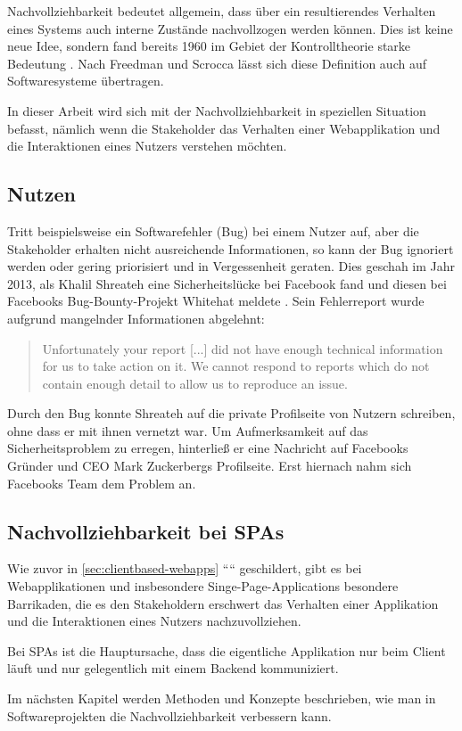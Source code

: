 Nachvollziehbarkeit bedeutet allgemein, dass über ein resultierendes Verhalten eines Systems auch interne Zustände nachvollzogen werden können. Dies ist keine neue Idee, sondern fand bereits 1960 im Gebiet der Kontrolltheorie starke Bedeutung \cite{OnTheGeneralTheoryOfControlSystems}. Nach Freedman \cite{TestabilityOfSoftwareComponents} und Scrocca \etal \cite{EnablingEventDrivenObservability} lässt sich diese Definition auch auf Softwaresysteme übertragen.
	
In dieser Arbeit wird sich mit der Nachvollziehbarkeit in speziellen Situation befasst, nämlich wenn die Stakeholder das Verhalten einer Webapplikation und die Interaktionen eines Nutzers verstehen möchten.%
	
\subsection{Nutzen}
	
Tritt beispielsweise ein Softwarefehler (Bug) bei einem Nutzer auf, aber die Stakeholder erhalten nicht ausreichende Informationen, so kann der Bug ignoriert werden oder gering priorisiert und in Vergessenheit geraten. Dies geschah im Jahr 2013, als Khalil Shreateh eine Sicherheitslücke bei Facebook fand und diesen bei Facebooks Bug-Bounty-Projekt Whitehat meldete \cite{FacebookBugBounyHunt}. Sein Fehlerreport wurde aufgrund mangelnder Informationen abgelehnt:
	
\begin{quotation}
Unfortunately your report [...] did not have enough technical information for us to take action  on  it. We  cannot  respond  to  reports  which  do  not contain enough detail to allow us to reproduce an issue.
\end{quotation}
	
Durch den Bug konnte Shreateh auf die private Profilseite von Nutzern schreiben, ohne dass er mit ihnen vernetzt war. Um Aufmerksamkeit auf das Sicherheitsproblem zu erregen, hinterließ er eine Nachricht auf Facebooks Gründer und CEO Mark Zuckerbergs Profilseite. Erst hiernach nahm sich Facebooks Team dem Problem an.
	
\subsection{Nachvollziehbarkeit bei SPAs}
	
Wie zuvor in \autoref{sec:clientbased-webapps} ```` geschildert, gibt es bei Webapplikationen und insbesondere Singe-Page-Applications besondere Barrikaden, die es den Stakeholdern erschwert das Verhalten einer Applikation und die Interaktionen eines Nutzers nachzuvollziehen.
	
Bei SPAs ist die Hauptursache, dass die eigentliche Applikation nur beim Client läuft und nur gelegentlich mit einem Backend kommuniziert.
	
Im nächsten Kapitel werden Methoden und Konzepte beschrieben, wie man in Softwareprojekten die Nachvollziehbarkeit verbessern kann.
